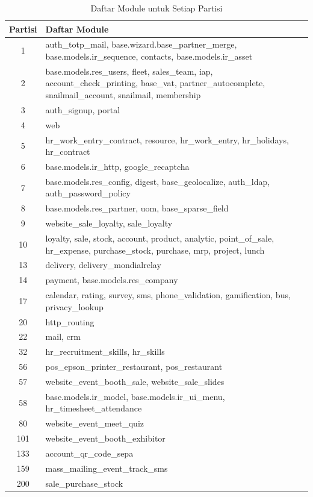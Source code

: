 \begingroup
\setlength{\LTleft}{-20cm plus -1fill}
\setlength{\LTright}{\LTleft}
\begin{small}
	\begin{longtable}{|c|p{14cm}|}
		\caption{Daftar Module untuk Setiap Partisi}
		\label{tab:daftar_module_final}\\
		\hline
		\textbf{Partisi} & \textbf{Daftar Module}
		\\
		\endfirsthead
		\hline  
		1 & auth{\_}totp{\_}mail, base.wizard.base{\_}partner{\_}merge, base.models.ir{\_}sequence, contacts, base.models.ir{\_}asset \\ \hline
		2 & base.models.res{\_}users, fleet, sales{\_}team, iap, account{\_}check{\_}printing, base{\_}vat, partner{\_}autocomplete, snailmail{\_}account, snailmail, membership \\ \hline
		3 & auth{\_}signup, portal \\ \hline
		4 & web \\ \hline
		5 & hr{\_}work{\_}entry{\_}contract, resource, hr{\_}work{\_}entry, hr{\_}holidays, hr{\_}contract \\ \hline
		6 & base.models.ir{\_}http, google{\_}recaptcha \\ \hline
		7 & base.models.res{\_}config, digest, base{\_}geolocalize, auth{\_}ldap, auth{\_}password{\_}policy \\ \hline
		8 & base.models.res{\_}partner, uom, base{\_}sparse{\_}field \\ \hline
		9 & website{\_}sale{\_}loyalty, sale{\_}loyalty \\ \hline
		10 & loyalty, sale, stock, account, product, analytic, point{\_}of{\_}sale, hr{\_}expense, purchase{\_}stock, purchase, mrp, project, lunch \\ \hline
		13 & delivery, delivery{\_}mondialrelay \\ \hline
		14 & payment, base.models.res{\_}company \\ \hline
		17 & calendar, rating, survey, sms, phone{\_}validation, gamification, bus, privacy{\_}lookup \\ \hline
		20 & http{\_}routing \\ \hline
		22 & mail, crm \\ \hline
		32 & hr{\_}recruitment{\_}skills, hr{\_}skills \\ \hline
		56 & pos{\_}epson{\_}printer{\_}restaurant, pos{\_}restaurant \\ \hline
		57 & website{\_}event{\_}booth{\_}sale, website{\_}sale{\_}slides \\ \hline
		58 & base.models.ir{\_}model, base.models.ir{\_}ui{\_}menu, hr{\_}timesheet{\_}attendance \\ \hline
		80 & website{\_}event{\_}meet{\_}quiz \\ \hline
		101 & website{\_}event{\_}booth{\_}exhibitor \\ \hline
		133 & account{\_}qr{\_}code{\_}sepa \\ \hline
		159 & mass{\_}mailing{\_}event{\_}track{\_}sms \\ \hline
		200 & sale{\_}purchase{\_}stock \\ \hline
	\end{longtable}
\end{small}
\endgroup

